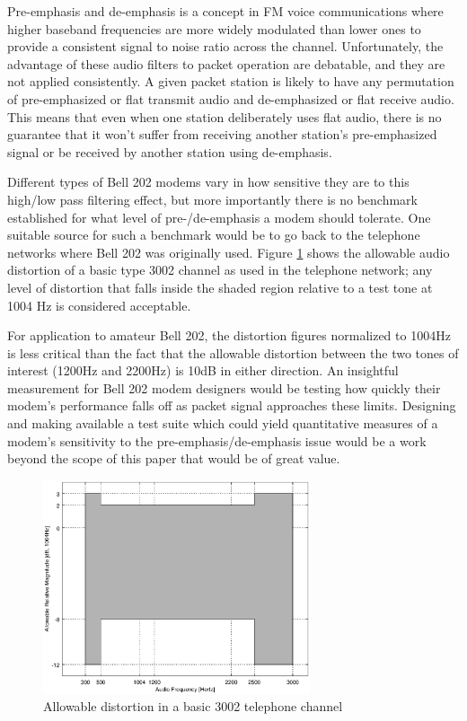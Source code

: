 \documentclass[12pt,letterpaper]{article}
\begin{document}
Pre-emphasis and de-emphasis is a concept in FM voice communications where
higher baseband frequencies are more widely modulated than lower ones
to provide a consistent signal to noise ratio across the channel.
Unfortunately, the advantage of these audio filters to packet operation 
are debatable, and they are not applied consistently. A given packet 
station is likely to have any permutation of pre-emphasized or flat 
transmit audio and de-emphasized or flat receive audio.
This means that even when one station deliberately uses flat audio,
there is no guarantee that it won't suffer from receiving another
station's pre-emphasized signal or be received by another station using de-emphasis.

Different types of Bell 202 modems vary in how sensitive they are to this high/low
pass filtering effect, but more importantly there is no benchmark established
for what level of pre-/de-emphasis a modem should tolerate.
One suitable source for such a benchmark would be to go back to the
telephone networks where Bell 202 was originally used.
Figure \ref{fig:3002} shows the allowable audio distortion of a basic type 3002
channel as used in the telephone network; any level of distortion that falls 
inside the shaded region relative to a test tone at 1004 Hz is considered acceptable.

For application to amateur Bell 202, the distortion figures normalized to 1004Hz is 
less critical than the fact that the allowable distortion between the two
tones of interest (1200Hz and 2200Hz) is 10dB in either direction.
An insightful measurement for Bell 202 modem designers would be testing how
quickly their modem's performance falls off as packet signal approaches these limits.
Designing and making available a test suite which could yield quantitative
measures of a modem's sensitivity to the pre-emphasis/de-emphasis issue would
be a work beyond the scope of this paper that would be of great value.

\begin{figure}
	\centering
	\includegraphics[width=0.7\textwidth]{src/octave/3002}
	\caption{Allowable distortion in a basic 3002 telephone channel}
	\label{fig:3002}
\end{figure}
\end{document}

